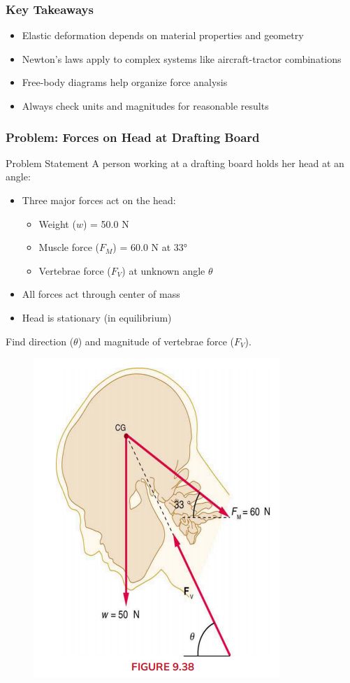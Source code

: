 \documentclass{beamer}
\begin{document}
\begin{frame}
\frametitle{Key Takeaways}
\begin{itemize}
    \item Elastic deformation depends on material properties and geometry
    \item Newton's laws apply to complex systems like aircraft-tractor combinations
    \item Free-body diagrams help organize force analysis
    \item Always check units and magnitudes for reasonable results
\end{itemize}
\end{frame}

\begin{frame}
\frametitle{Problem: Forces on Head at Drafting Board}
\begin{block}{Problem Statement}
A person working at a drafting board holds her head at an angle:
\begin{itemize}
    \item Three major forces act on the head:
    \begin{itemize}
        \item Weight ($w$) = 50.0 N
        \item Muscle force ($F_M$) = 60.0 N at 33°
        \item Vertebrae force ($F_V$) at unknown angle $\theta$
    \end{itemize}
    \item All forces act through center of mass
    \item Head is stationary (in equilibrium)
\end{itemize}
Find direction ($\theta$) and magnitude of vertebrae force ($F_V$).
\end{block}
\begin{figure}
    \centering
    \includegraphics[width=0.2\linewidth]{CH9.5 4,5,9 Review/Screenshot 2024-11-11 143247.png}
\end{figure}

\end{frame}
\end{document}
